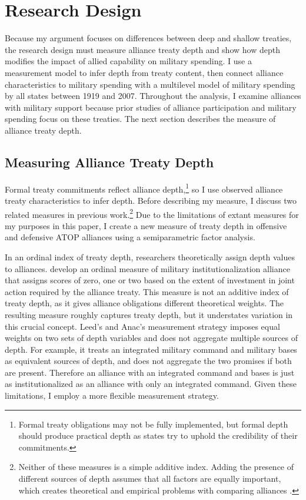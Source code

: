 \documentclass[12pt]{article}
\begin{document}
\section{Research Design} 


Because my argument focuses on differences between deep and shallow treaties, the research design must measure alliance treaty depth and show how depth modifies the impact of allied capability on military spending.  
I use a measurement model to infer depth from treaty content, then connect alliance characteristics to military spending with a multilevel model of military spending by all states between 1919 and 2007. 
Throughout the analysis, I examine alliances with military support because prior studies of alliance participation and military spending focus on these treaties.
The next section describes the measure of alliance treaty depth. 


\subsection{Measuring Alliance Treaty Depth} 


Formal treaty commitments reflect alliance depth,\footnote{Formal treaty obligations may not be fully implemented, but formal depth should produce practical depth as states try to uphold the credibility of their commitments.} so I use observed alliance treaty characteristics to infer depth. 
Before describing my measure, I discuss two related measures in previous work.\footnote{Neither of these measures is a simple additive index. Adding the presence of different sources of depth assumes that all factors are equally important, which creates theoretical and empirical problems with comparing alliances \citep[pg. 876]{BensonClinton2016}.} 
Due to the limitations of extant measures for my purposes in this paper, I create a new measure of treaty depth in offensive and defensive ATOP alliances using a semiparametric factor analysis. 


In an ordinal index of treaty depth, researchers theoretically assign depth values to alliances. 
\citep{LeedsAnac2005} develop an ordinal measure of military institutionalization alliance that assigns scores of zero, one or two based on the extent of investment in joint action required by the alliance treaty. 
This measure is not an additive index of treaty depth, as it gives alliance obligations different theoretical weights.  
The resulting measure roughly captures treaty depth, but it understates variation in this crucial concept. 
Leed's and Anac's measurement strategy imposes equal weights on two sets of depth variables and does not aggregate multiple sources of depth. 
For example, it treats an integrated military command and military bases as equivalent sources of depth, and does not aggregate the two promises if both are present. 
Therefore an alliance with an integrated command and bases is just as institutionalized as an alliance with only an integrated command. 
Given these limitations, I employ a more flexible measurement strategy.
\end{document}
